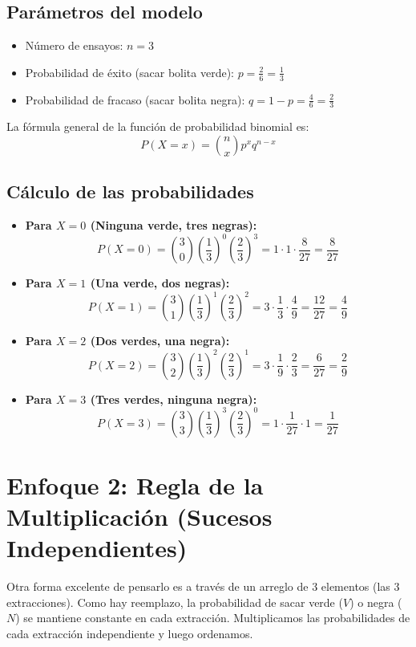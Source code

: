 \documentclass[a4paper,12pt]{article}
\begin{document}
\subsection*{Parámetros del modelo}
\begin{itemize}
    \item Número de ensayos: $n = 3$
    \item Probabilidad de éxito (sacar bolita verde): $p = \frac{2}{6} = \frac{1}{3}$
    \item Probabilidad de fracaso (sacar bolita negra): $q = 1 - p = \frac{4}{6} = \frac{2}{3}$
\end{itemize}

La fórmula general de la función de probabilidad binomial es:
$$P(X = x) = \binom{n}{x} p^x q^{n-x}$$

\subsection*{Cálculo de las probabilidades}
\begin{itemize}
    \item \textbf{Para $X = 0$ (Ninguna verde, tres negras):}
    $$P(X = 0) = \binom{3}{0} \left(\frac{1}{3}\right)^0 \left(\frac{2}{3}\right)^3 = 1 \cdot 1 \cdot \frac{8}{27} = \frac{8}{27}$$

    \item \textbf{Para $X = 1$ (Una verde, dos negras):}
    $$P(X = 1) = \binom{3}{1} \left(\frac{1}{3}\right)^1 \left(\frac{2}{3}\right)^2 = 3 \cdot \frac{1}{3} \cdot \frac{4}{9} = \frac{12}{27} = \frac{4}{9}$$

    \item \textbf{Para $X = 2$ (Dos verdes, una negra):}
    $$P(X = 2) = \binom{3}{2} \left(\frac{1}{3}\right)^2 \left(\frac{2}{3}\right)^1 = 3 \cdot \frac{1}{9} \cdot \frac{2}{3} = \frac{6}{27} = \frac{2}{9}$$

    \item \textbf{Para $X = 3$ (Tres verdes, ninguna negra):}
    $$P(X = 3) = \binom{3}{3} \left(\frac{1}{3}\right)^3 \left(\frac{2}{3}\right)^0 = 1 \cdot \frac{1}{27} \cdot 1 = \frac{1}{27}$$
\end{itemize}

\vspace{0.5cm}

\section*{Enfoque 2: Regla de la Multiplicación (Sucesos Independientes)}
Otra forma excelente de pensarlo es a través de un arreglo de 3 elementos (las 3 extracciones). Como hay reemplazo, la probabilidad de sacar verde ($V$) o negra ($N$) se mantiene constante en cada extracción. Multiplicamos las probabilidades de cada extracción independiente y luego ordenamos.
\end{document}
